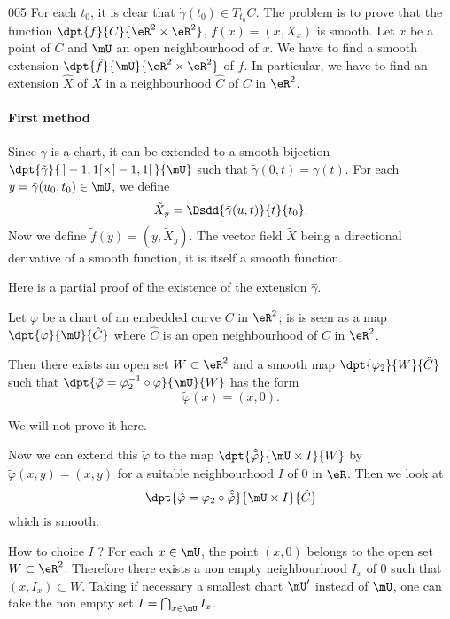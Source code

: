 \begin{corrige}{005}
For each $t_0$, it is clear that $\dot\gamma(t_0)\in T_{t_0}C$. The problem is to prove that the function $\dpt{ f }{ C }{ \eR^2\times\eR^2 }$, $f(x)=(x,X_x)$ is smooth. Let $x$ be a point of $C$ and $\mU$ an open neighbourhood of $x$. We have to find a smooth extension $\dpt{ \tilde f }{ \mU }{ \eR^2\times\eR^2 }$ of $f$. In particular, we have to find an extension $\hat X$ of $X$ in a neighbourhood $\hat C$ of $C$ in $\eR^2$.

\paragraph{First method}

Since $\gamma$ is a chart, it can be extended to a smooth bijection $\dpt{ \tilde\gamma }{ \,]-1,1[\times]-1,1[\, }{ \mU }$ such that $\tilde\gamma(0,t)=\gamma(t)$. For each $y=\tilde\gamma(u_0,t_0)\in \mU$, we define 
\[ 
  \tilde X_y=\Dsdd{ \tilde\gamma(u,t) }{t}{t_0}.
\]
Now we define $\tilde f(y)=(y,\tilde X_y)$. The vector field $\tilde X$ being a directional derivative of a smooth function, it is itself a smooth function.

Here is a partial proof of the existence of the extension $\hat\gamma$. 

\begin{lemma}
Let $\varphi$ be a chart of an embedded curve $C$ in $\eR^2$; is is seen as a map $\dpt{ \varphi }{ \mU }{ \hat C }$ where $\hat C$ is an open neighbourhood of $C$ in $\eR^2$.

Then there exists an open set $W\subset \eR^2$ and a smooth map $\dpt{ \varphi_2 }{W}{ \hat C }$ such that $\dpt{ \tilde\varphi=\varphi_2^{-1}\circ\varphi }{ \mU }{ W }$ has the form
\[ 
  \tilde\varphi(x)=(x,0).
\]

\end{lemma}
We will not prove it here.

Now we can extend this $\tilde\varphi$ to the map $\dpt{ \hat{\tilde\varphi} }{ \mU\times I }{ W }$ by $\hat{\tilde\varphi}(x,y)=(x,y)$ for a suitable neighbourhood $I$ of $0$ in $\eR$. Then we look at
\[ 
  \dpt{ \hat\varphi=\varphi_2\circ\hat{\tilde\varphi} }{ \mU\times I }{ \hat C }
\]
which is smooth.

How to choice $I$ ?  For each $x\in\mU$, the point $(x,0)$ belongs to the open set $W\subset \eR^2$. Therefore there exists a non empty neighbourhood $I_x$ of $0$ such that $(x,I_x)\subset W$. Taking if necessary a smallest chart $\mU'$ instead of $\mU$, one can take the non empty set
$I=\bigcap_{x\in\mU}I_x$.


\end{corrige}
